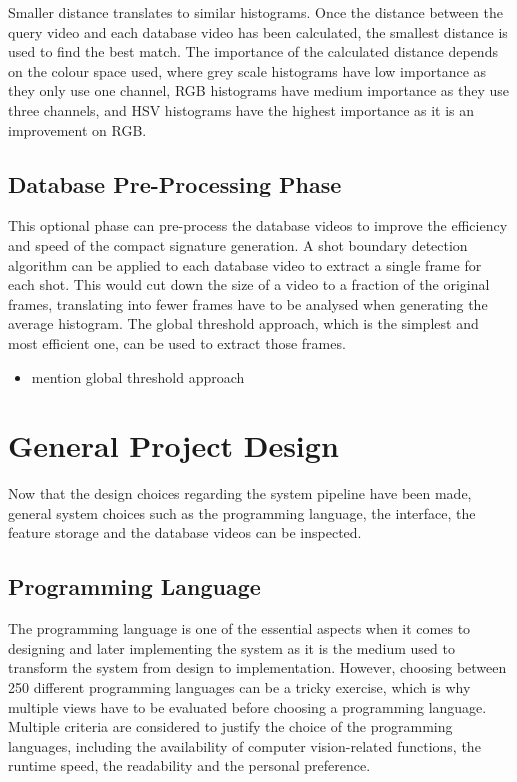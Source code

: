 Smaller distance translates to similar histograms. Once the distance between the query video and each database video has been calculated, the smallest distance is used to find the best match. The importance of the calculated distance depends on the colour space used, where grey scale histograms have low importance as they only use one channel, RGB histograms have medium importance as they use three channels, and HSV histograms have the highest importance as it is an improvement on RGB.

\subsection{Database Pre-Processing Phase}

This optional phase can pre-process the database videos to improve the efficiency and speed of the compact signature generation. A shot boundary detection algorithm can be applied to each database video to extract a single frame for each shot. This would cut down the size of a video to a fraction of the original frames, translating into fewer frames have to be analysed when generating the average histogram. The global threshold approach, which is the simplest and most efficient one, can be used to extract those frames. 

\begin{itemize}
    \item mention global threshold approach
\end{itemize}

\section{General Project Design}

Now that the design choices regarding the system pipeline have been made, general system choices such as the programming language, the interface, the feature storage and the database videos can be inspected.

\subsection{Programming Language}

The programming language is one of the essential aspects when it comes to designing and later implementing the system as it is the medium used to transform the system from design to implementation. However, choosing between 250 different programming languages \cite{tiobe} can be a tricky exercise, which is why multiple views have to be evaluated before choosing a programming language. Multiple criteria are considered to justify the choice of the programming languages, including the availability of computer vision-related functions, the runtime speed, the readability and the personal preference.\\

